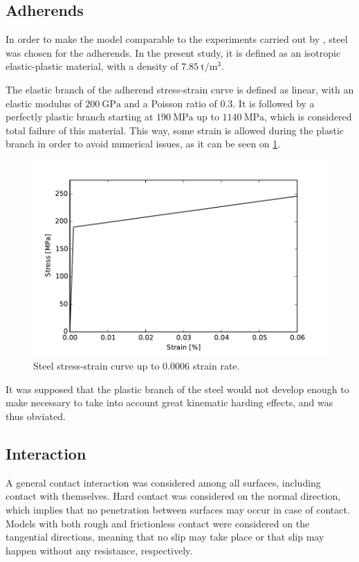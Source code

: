 \documentclass[cmfonts]{witpress}
\begin{document}
\subsection{Adherends}

In order to make the model comparable to the experiments carried out by \cite{Peroni2009}, steel was chosen for the adherends. In the present study, it is defined as an isotropic elastic-plastic material, with a density of $\SI{7.85}{\tonne/\m^3}$.

The elastic branch of the adherend stress-strain curve is defined as linear, with an elastic modulus of $\SI{200}{\GPa}$ and a Poisson ratio of $\num{0.3}$. It is followed by a perfectly plastic branch starting at $\SI{190}{\MPa}$ up to $\SI{1140}{\MPa}$, which is considered total failure of this material. This way, some strain is allowed during the plastic branch in order to avoid numerical issues, as it can be seen on \cref{fig:steel}.

\begin{figure}
	\centering
	\includegraphics[width=0.7\linewidth]{figures/IMG_CUTRES/steel}
	\caption{Steel stress-strain curve up to $\num{0.0006}$ strain rate.}
	\label{fig:steel}
\end{figure}

It was supposed that the plastic branch of the steel would not develop enough to make necessary to take into account great kinematic harding effects, and was thus obviated.

\subsection{Interaction}

A general contact interaction was considered among all surfaces, including contact with themselves. Hard contact was considered on the normal direction, which implies that no penetration between surfaces may occur in case of contact. Models with both rough and frictionless contact were considered on the tangential directions, meaning that no slip may take place or that slip may happen without any resistance, respectively.
\end{document}
